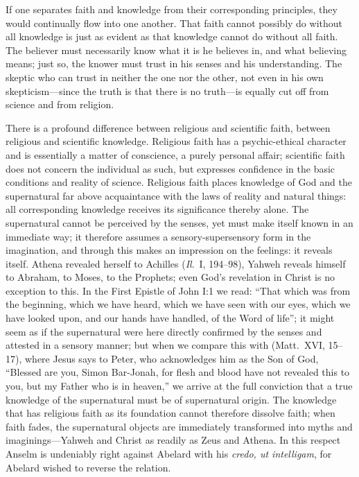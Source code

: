\documentclass[12pt,a4paper]{article}
\begin{document}
If one separates faith and knowledge from their corresponding
principles, they would continually flow into one another. That faith
cannot possibly do without all knowledge is just as evident as that
knowledge cannot do without all faith. The believer must necessarily
know what it is he believes in, and what believing means; just so, the
knower must trust in his senses and his understanding. The skeptic who
can trust in neither the one nor the other, not even in his own
skepticism---since the truth is that there is no truth---is equally cut
off from science and from religion.

There is a profound difference between religious and scientific faith,
between religious and scientific knowledge. Religious faith has a
psychic-ethical character and is essentially a matter of conscience, a
purely personal affair; scientific faith does not concern the
individual as such, but expresses confidence in the basic conditions
and reality of science. Religious faith places knowledge of God and the
supernatural far above acquaintance with the laws of reality and
natural things: all corresponding knowledge receives its significance
thereby alone. The supernatural cannot be perceived by the senses, yet
must make itself known in an immediate way; it therefore assumes a
sensory-supersensory form in the imagination, and through this makes an
impression on the feelings: it reveals itself. Athena revealed herself
to Achilles (\emph{Il}.\ I, 194--98), Yahweh reveals himself to
Abraham, to Moses, to the Prophets; even God's revelation in Christ is
no exception to this. In the First Epistle of John I:1 we read: ``That
which was from the beginning, which we have heard, which we have seen
with our eyes, which we have looked upon, and our hands have handled,
of the Word of life''; it might seem as if the supernatural were here
directly confirmed by the senses and attested in a sensory manner; but
when we compare this with (Matt.\ XVI, 15--17), where Jesus says to
Peter, who acknowledges him as the Son of God, ``Blessed are you, Simon
Bar-Jonah, for flesh and blood have not revealed this to you, but my
Father who is in heaven,'' we arrive at the full conviction that a true
knowledge of the supernatural must be of supernatural origin. The
knowledge that has religious faith as its foundation cannot therefore
dissolve faith; when faith fades, the supernatural objects are
immediately transformed into myths and imaginings---Yahweh and Christ
as readily as Zeus and Athena. In this respect Anselm is undeniably
right against Abelard with his \emph{credo, ut intelligam}, for Abelard
wished to reverse the relation.
\end{document}
